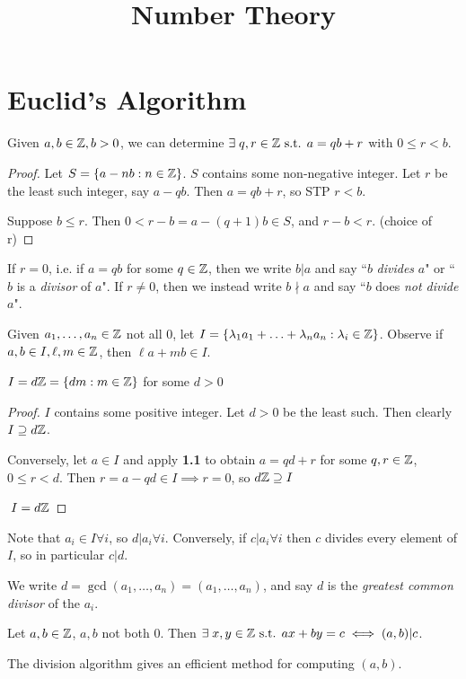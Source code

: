 \documentclass[10pt,a4paper]{article}
\title{Number Theory}
\begin{document}
\maketitle
\section{Euclid's Algorithm}
\begin{theorem}%
Given $a, b \in \mathbb{Z}, b > 0$, we can determine $\exists q, r \in \Z \st a = qb+r$ with $0 \leq r <b$.
\end{theorem}
\begin{proof}
Let $S = \{a-nb : n\in\mathbb{Z}\}$. $S$ contains some non-negative integer. Let $r$ be the least such integer, say $a-qb$. Then $a = qb + r$, so STP $r < b$.

Suppose $b \leq r$. Then $0 < r-b = a-(q+1)b \in S$, and $r-b < r$. \contr (choice of r)
\end{proof}

If $r=0$, i.e. if $a=qb$ for some $q \in \mathbb{Z}$, then we write $b| a$ and say ``$b$ \emph{divides}
$a$" or ``$b$ is a \emph{divisor} of $a$". If $r\neq 0$, then we instead write $b\nmid a$ and say ``$b$ does \emph{not divide} $a$".

Given $a_1,\ldots, a_n \in \mathbb{Z}$ not all $0$, let $I=\{\lambda_1 a_1+\ldots+\lambda_n a_n : \lambda_i \in \mathbb{Z}\}$. Observe if $a,b \in I, \ell, m \in \mathbb{Z}$, then $\ell a + mb \in I$.

\begin{theorem}
$I = d\mathbb{Z} = \{dm:m\in\mathbb{Z}\}$ for some $d > 0$
\end{theorem}
\begin{proof}
$I$ contains some positive integer. Let $d > 0$ be the least such. Then clearly $I \supseteq d\mathbb{Z}$.

Conversely, let $a\in I$ and apply \textbf{1.1} to obtain $a = qd+r$ for some $q,r \in \mathbb{Z}$, $0\leq r < d$. Then $r=a-qd \in I \implies r = 0$, so $d\mathbb{Z}\supseteq I$

\therefore $\;I = d\mathbb{Z}$
\end{proof}

Note that $a_i \in I \forall i$, so $d| a_i \forall i$. Conversely, if $c | a_i \forall i$ then $c$ divides every element of $I$, so in particular $c | d$.

We write $d = \gcd(a_1, \ldots, a_n) = (a_1, \ldots, a_n)$, and say $d$ is the \emph{greatest common divisor} of the $a_i$.

\begin{corollary}[B\'ezout]
Let $a,b \in \mathbb{Z}$, $a,b$ not both $0$. Then $\exists x,y \in \Z \st ax+by=c \iff (a,b)| c$.
\end{corollary}
The division algorithm gives an efficient method for computing $(a,b)$.
\end{document}
